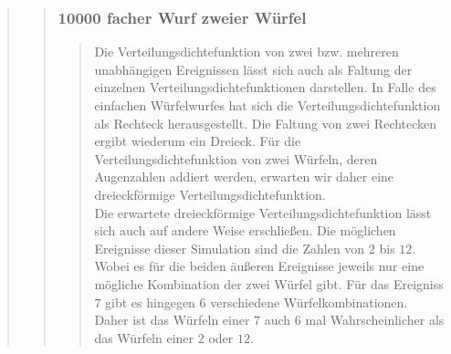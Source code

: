 \begin{quote}
\begin{quote}
        \subsubsection{10000 facher Wurf zweier Würfel}
        \begin{quote}
            Die Verteilungsdichtefunktion von zwei bzw. mehreren unabhängigen Ereignissen lässt sich auch als Faltung
            der einzelnen Verteilungsdichtefunktionen darstellen. In Falle des einfachen Würfelwurfes hat sich die
            Verteilungsdichtefunktion als Rechteck herausgestellt. Die Faltung
            von zwei Rechtecken ergibt wiederum ein Dreieck. Für die
            Verteilungsdichtefunktion von zwei Würfeln, deren Augenzahlen
            addiert werden, erwarten wir daher eine dreieckförmige Verteilungsdichtefunktion.\\
            Die erwartete dreieckförmige Verteilungsdichtefunktion lässt sich auch auf andere Weise erschließen. Die
            möglichen Ereignisse dieser Simulation sind die Zahlen von $2$ bis $12$. Wobei es für die beiden äußeren
            Ereignisse jeweils nur eine mögliche Kombination der zwei Würfel
            gibt. Für das Ereigniss $7$ gibt es hingegen $6$ verschiedene Würfelkombinationen. Daher ist das Würfeln einer $7$ auch $6$ mal Wahrscheinlicher
            als das Würfeln einer $2$ oder $12$.\\
            

\end{quote}
\end{quote}
\end{quote}
